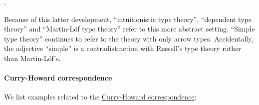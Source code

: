 \begin{concept}\label{con:homotopy_type_theory}
\end{concept}

\begin{concept}\label{con:dependent_types}

  .
\end{concept}

\begin{remark}\label{rem:dependent_type_theory}
  Because of this latter development, \enquote{intuitionistic type theory}, \enquote{dependent type theory} and \enquote{Martin-L\"of type theory} refer to this more abstract setting. \enquote{Simple type theory} continues to refer to the theory with only arrow types. Accidentally, the adjective \enquote{simple} is a contradistinction with Russell's type theory rather than Martin-L\"of's.
\end{remark}

\paragraph{Curry-Howard correspondence}\hfill

\begin{example}\label{ex:con:curry_howard_correspondence}
  We list examples related to the \hyperref[con:curry_howard_correspondence]{Curry-Howard correspondence}:
  \begin{thmenum}
  \end{thmenum}
\end{example}

\begin{algorithm}\label{alg:type_derivation_to_proof_tree}
\end{algorithm}

\begin{algorithm}\label{alg:proof_tree_to_type_derivation}
\end{algorithm}
